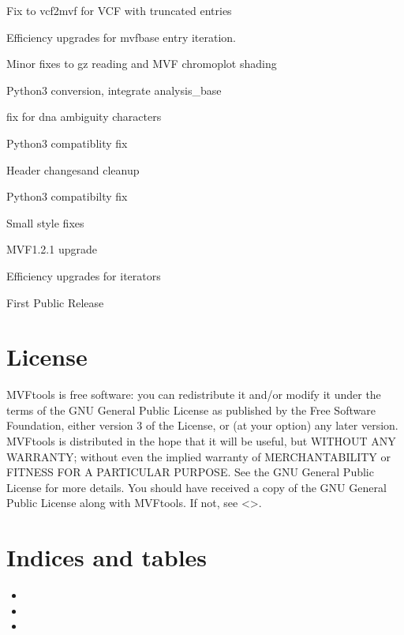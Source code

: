 \documentclass[letterpaper,11pt,english]{sphinxmanual}
\begin{document}

Fix to vcf2mvf for VCF with truncated entries


Efficiency upgrades for mvfbase entry iteration.


Minor fixes to gz reading and MVF chromoplot shading


Python3 conversion, integrate analysis\_base


fix for dna ambiguity characters


Python3 compatiblity fix


Header changesand cleanup


Python3 compatibilty fix


Small style fixes


MVF1.2.1 upgrade


Efficiency upgrades for iterators


First Public Release


\chapter{License}
\label{\detokenize{version:license}}
MVFtools is free software: you can redistribute it and/or modify
it under the terms of the GNU General Public License as published by
the Free Software Foundation, either version 3 of the License, or
(at your option) any later version.
MVFtools is distributed in the hope that it will be useful,
but WITHOUT ANY WARRANTY; without even the implied warranty of
MERCHANTABILITY or FITNESS FOR A PARTICULAR PURPOSE.  See the
GNU General Public License for more details.
You should have received a copy of the GNU General Public License
along with MVFtools.  If not, see \textless{}\textgreater{}.


\chapter{Indices and tables}
\label{\detokenize{index:indices-and-tables}}\begin{itemize}
\item {} 

\item {} 

\item {} 

\end{itemize}



\renewcommand{\indexname}{Index}
\printindex
\end{document}
